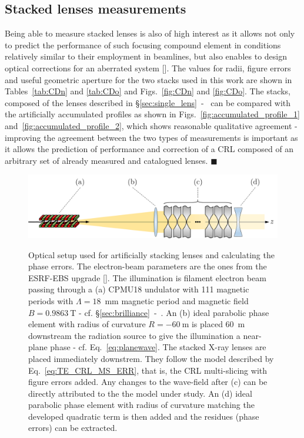 \begin{refsection}
\subsection{Stacked lenses measurements}\label{sec:lens_stack}

Being able to measure stacked lenses is also of high interest as it allows not only to predict the performance of such focusing compound element in conditions relatively similar to their employment in beamlines, but also enables to design optical corrections for an aberrated system [\cite{Seiboth2017, Seiboth2020}]. The values for radii, figure errors and useful geometric aperture for the two stacks used in this work are shown in Tables~\ref{tab:CDn} and \ref{tab:CDo} and Figs.~\ref{fig:CDn} and \ref{fig:CDo}. The stacks, composed of the lenses described in \S\ref{sec:single_lens}~-~\textit{} can be compared with the artificially accumulated profiles as shown in Figs.~\ref{fig:accumulated_profile_1} and~\ref{fig:accumulated_profile_2}, which shows reasonable qualitative agreement - improving the agreement between the two types of measurements is important as it allows the prediction of performance and correction of a CRL composed of an arbitrary set of already measured and catalogued lenses. $\blacksquare$

\begin{figure}[t]
    \centering
    {\includegraphics[width=.7\linewidth]{figures/ch04b/recovered_phase.png}}
    \caption[Optical layout used for artificially stacking lenses]{Optical setup used for artificially stacking lenses and calculating the phase errors. The electron-beam parameters are the ones from the ESRF-EBS upgrade [\cite{orangebook}]. The illumination is filament electron beam passing through a (a) CPMU18 undulator with 111 magnetic periods with $\Lambda=18$~mm magnetic period and magnetic field $B=0.9863~$T - cf. \S\ref{sec:brilliance}~-~\textit{}. An (b) ideal parabolic phase element with radius of curvature $R=-60~$m is placed 60~m downstream the radiation source to give the illumination a near-plane phase - cf. Eq.~\ref{eq:planewave}. The stacked X-ray lenses are placed immediately downstrem. They follow the model described by Eq.~\ref{eq:TE_CRL_MS_ERR}, that is, the CRL multi-slicing with figure errors added. Any changes to the wave-field after (c) can be directly attributed to the the model under study. An (d) ideal parabolic phase element with radius of curvature matching the developed quadratic term is then added and the residues (phase errors) can be extracted.}
    \label{fig:accumulated_extraction}
\end{figure}


\end{refsection}
